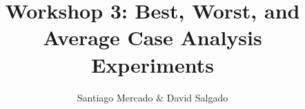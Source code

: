 \documentclass[journal,onecolumn]{IEEEtran}	%
\begin{document}
\title{Workshop 3: Best, Worst, and Average Case Analysis Experiments }%
\author{Santiago Mercado & David Salgado}%
\maketitle				%









\end{document}
